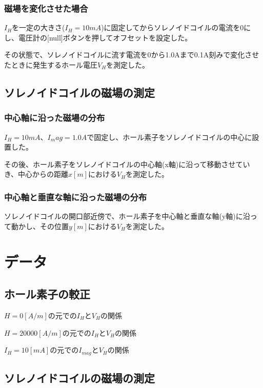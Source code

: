 \documentclass[uplatex,11pt]{jsarticle}
\newcommand{\tab}[4]{ %
    \begin{table}[htb]
        \centering
        \caption{#3}
        
        \label{tab_#1}
    \end{table}
}
\begin{document}
\subsubsection{磁場を変化させた場合}

$I_H$を一定の大きさ($I_H = 10mA$)に固定してからソレノイドコイルの電流を0にし、電圧計の[null]ボタンを押してオフセットを設定した。

その状態で、ソレノイドコイルに流す電流を0から1.0Aまで0.1A刻みで変化させたときに発生するホール電圧$V_H$を測定した。

\subsection{ソレノイドコイルの磁場の測定}

\subsubsection{中心軸に沿った磁場の分布}

$I_H = 10mA$、$I_mag = 1.0A$で固定し、ホール素子をソレノイドコイルの中心に設置した。

その後、ホール素子をソレノイドコイルの中心軸(x軸)に沿って移動させていき、中心からの距離$x[m]$における$V_H$を測定した。

\subsubsection{中心軸と垂直な軸に沿った磁場の分布}
ソレノイドコイルの開口部近傍で、ホール素子を中心軸と垂直な軸(y軸)に沿って動かし、その位置$y[m]$における$V_H$を測定した。

\section{データ}
\subsection{ホール素子の較正}

\tab{a_2}{./csv/jikken_a_2.csv}{ $H=0[A/m]$の元での$I_H$と$V_H$の関係 }{1}
\tab{a_3}{./csv/jikken_a_3.csv}{ $H=20000[A/m]$の元での$I_H$と$V_H$の関係 }{1}
\tab{a_4}{./csv/jikken_a_4.csv}{ $I_H = 10[mA]$の元での$I_{mag}$と$V_H$の関係 }{1}

\subsection{ソレノイドコイルの磁場の測定}
\end{document}
